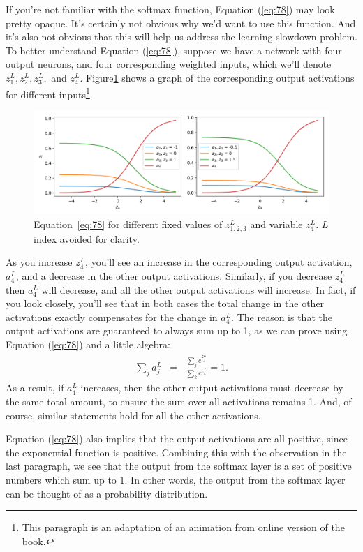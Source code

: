 \documentclass[a4paper,twoside,10pt]{book}
\begin{document}
If you're not familiar with the softmax function, Equation (\ref{eq:78}) may look pretty opaque. It's certainly not obvious why we'd want to use this function. And it's also not obvious that this will help us address the learning slowdown problem. To better understand Equation (\ref{eq:78}), suppose we have a network with four output neurons, and four corresponding weighted inputs, which we'll denote $z^L_1,z^L_2,z^L_3,$ and $z^L_4$. Figure\ref{fig:softmax} shows  a graph of the corresponding output activations for different inputs\footnote{This paragraph is an adaptation of an animation from online version of the book.}.
\begin{figure}

\includegraphics[width=\linewidth]{./figures/ch3/animation_softmax}
\caption{Equation~\ref{eq:78} for different fixed values of $z^L_{1,2,3}$ and variable $z^L_4$. $L$ index avoided for clarity. }
\label{fig:softmax}
\end{figure}

As you increase $z^L_4$, you'll see an increase in the corresponding output activation, $a^L_4$, and a decrease in the other output activations. Similarly, if you decrease $z^L_4$ then $a^L_4$ will decrease, and all the other output activations will increase. In fact, if you look closely, you'll see that in both cases the total change in the other activations exactly compensates for the change in $a^L_4$. The reason is that the output activations are guaranteed to always sum up to 1, as we can prove using Equation (\ref{eq:78}) and a little algebra:
\begin{eqnarray}
\sum_j a^L_j & = & \frac{\sum_j e^{z^L_j}}{\sum_k e^{z^L_k}} = 1.
\label{eq:79}\end{eqnarray}
As a result, if $a^L_4$ increases, then the other output activations must decrease by the same total amount, to ensure the sum over all activations remains 1. And, of course, similar statements hold for all the other activations.

Equation (\ref{eq:78}) also implies that the output activations are all positive, since the exponential function is positive. Combining this with the observation in the last paragraph, we see that the output from the softmax layer is a set of positive numbers which sum up to 1. In other words, the output from the softmax layer can be thought of as a probability distribution.
\end{document}
